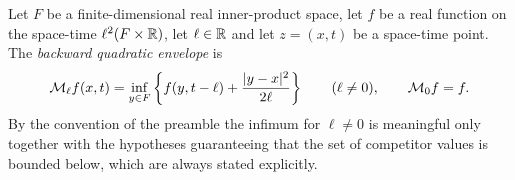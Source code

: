 \begin{definition}
Let $F$ be a finite-dimensional real inner-product space, let $f$ be a real
function on the space-time $\ell^2(F\times\mathbb{R})$, let $\ell\in\mathbb{R}$ and let
$z=(x,t)$ be a space-time point. The \emph{backward quadratic envelope} is
\[
  \mathcal{M}_\ell f(x,t)
    =\inf_{y\in F}\left\{f(y,t-\ell)+\frac{|y-x|^2}{2\ell}\right\}
  \qquad(\ell\ne0),
  \qquad
  \mathcal{M}_0f=f .
\]
By the convention of the preamble the infimum for $\ell\ne0$ is meaningful only
together with the hypotheses guaranteeing that the set of competitor values is
bounded below, which are always stated explicitly.
\end{definition}

